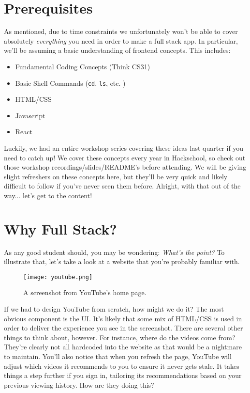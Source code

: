\section{Prerequisites}

As mentioned, due to time constraints we unfortunately won't be able to cover absolutely \emph{everything} you need in order to make a full stack app. In particular, we'll be assuming a basic understanding of frontend concepts. This includes:

\begin{itemize}
    \item Fundamental Coding Concepts (Think CS31)
    \item Basic Shell Commands (\texttt{cd}, \texttt{ls}, etc. )
    \item HTML/CSS
    \item Javascript
    \item React
\end{itemize}

Luckily, we had an entire workshop series covering these ideas last quarter if you need to catch up! We cover these concepts every year in Hackschool, so check out those workshop recordings/slides/README's before attending. We will be giving slight refreshers on these concepts here, but they'll be very quick and likely difficult to follow if you've never seen them before. Alright, with that out of the way... let's get to the content!

\section{Why Full Stack?}

As any good student should, you may be wondering: \emph{What's the point?} To illustrate that, let's take a look at a website that you're probably familiar with. 

\begin{figure*}[h!]
	\texttt{[image: youtube.png]}
    \caption[YouTube]{A screenshot from YouTube's home page. }
\end{figure*}

If we had to design YouTube from scratch, how might we do it? The most obvious component is the UI. It's likely that some mix of HTML/CSS is used in order to deliver the experience you see in the screenshot. There are several other things to think about, however. For instance, where do the videos come from? They're clearly not all hardcoded into the website as that would be a nightmare to maintain. You'll also notice that when you refresh the page, YouTube will adjust which videos it recommends to you to ensure it never gets stale. It takes things a step further if you sign in, tailoring its recommendations based on your previous viewing history. How are they doing this? 

